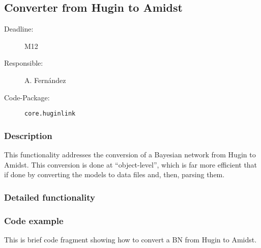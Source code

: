 \newpage
\subsection{Converter from Hugin to Amidst}
\label{ConverterFromHuginToAmidst}

\begin{description}
\item[Deadline:] M12
\item[Responsible:] A. Fern\'andez
\item[Code-Package:] \texttt{core.huginlink}
\end{description}
\subsubsection*{Description}

This functionality addresses the conversion of a Bayesian network from Hugin to Amidst. This conversion is done at ``object-level'', which is far more efficient that if done by converting the models to data files and, then, parsing them. 

\subsubsection*{Detailed functionality}

\vspace{1in}

\subsubsection*{Code example}

This is brief code fragment showing how to convert a BN from Hugin to Amidst. 

